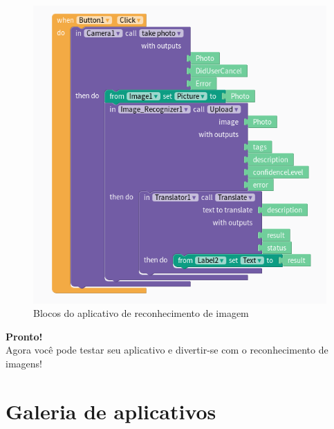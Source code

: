 \documentclass[11pt,fleqn]{book} %
\begin{document}
\begin{figure}[H]
	\centering
    \includegraphics[width=\textwidth]{Pictures/GuiaThunkReconBlocks.png}
    \caption{Blocos do aplicativo de reconhecimento de imagem}\label{fig:appreconblocks}
\end{figure}

\begin{center}
\textbf{Pronto!}\\ Agora você pode testar seu aplicativo e divertir-se com o reconhecimento de imagens! 
\end{center}


\chapter{Galeria de aplicativos}

\end{document}
